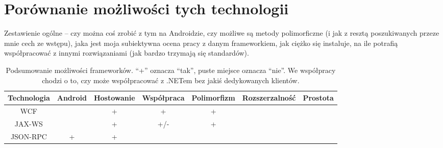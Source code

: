 \section{Porównanie możliwości tych technologii}
Zestawienie ogólne -- czy można coś zrobić z tym na Androidzie, czy możliwe są metody polimorficzne (i jak z resztą poszukiwanych przeze mnie cech ze wstępu), jaka jest moja subiektywna ocena pracy z danym frameworkiem, jak ciężko się instaluje, na ile potrafią współpracować z innymi rozwiązaniami (jak bardzo trzymają się standardów).

\begin{table}[htbp]
	\centering
		\begin{tabular}{ | c || c | c | c | c | c | c |}
			\hline
				Technologia & Android & Hostowanie & Współpraca & Polimorfizm & Rozszerzalność & Prostota  \\
				\hline \hline
				WCF & & + & + & + & &\\
				\hline
				JAX-WS & & + & +/- & + & &\\
				\hline
				JSON-RPC & + & + & & & &\\
				\hline
		\end{tabular}
	\caption[Podsumowanie możliwości frameworków.]{Podsumowanie możliwości frameworków. ``+'' oznacza ``tak'', puste miejsce oznacza ``nie''. We współpracy chodzi o to, czy może współpracować z .NETem bez jakiś dedykowanych klientów.}
	\label{tab:frameworks-summary}
\end{table}
